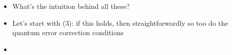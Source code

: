 \documentclass[12pt,a4paper]{article}
\numberwithin{equation}{section}
\newcommand{\ketbra}[2]{\ket{#1}\bra{#2}}
\newcommand{\ketbras}[1]{\ketbra{#1}{#1}}
\begin{document}
	\begin{itemize}
		\item What's the intuition behind all these?
		\item Let's start with (3): if this holds, then straightforwardly so too do the quantum error correction conditions
		\item 
	\end{itemize}
\end{document}
